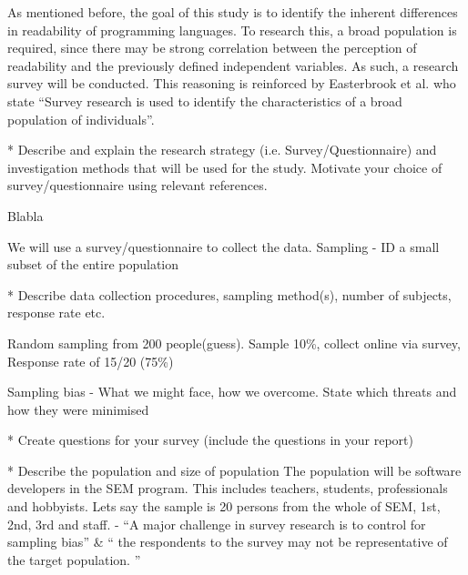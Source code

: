 \documentclass[times, 10pt,twocolumn]{IEEEtran}
\begin{document}
As mentioned before, the goal of this study is to identify the inherent differences in readability of programming languages. To research this, a broad population is required, since there may be strong correlation between the perception of readability and the previously defined independent variables. As such, a research survey will be conducted. This reasoning is reinforced by Easterbrook et al. \cite{easterbrook2008selecting} who state ``Survey research is used to identify the characteristics of a broad population of individuals''. 

* Describe  and explain the research  strategy (i.e.  Survey/Questionnaire)
and investigation methods that  will  be  used  for the study.  Motivate  your  
choice  of  survey/questionnaire  using relevant  references.
\newline


Blabla





We will use a survey/questionnaire to collect the data.
Sampling - ID a small subset of the entire population
\newline

* Describe  data  collection  procedures, sampling  method(s),  number  of  
subjects, response  rate  etc.
\newline

Random sampling from 200 people(guess). Sample 10\%, collect online via survey, Response rate of 15/20 (75\%)
\newline

Sampling bias - What we might face, how we overcome. State which threats and how they were minimised
\newline

* Create  questions for your  survey  (include  the questions in  your  report)
\newline

* Describe  the population  and size  of  population
\newline
The population will be software developers in the SEM program. This includes teachers, students, professionals and hobbyists. Lets say the sample is 20 persons from the whole of SEM, 1st, 2nd, 3rd and staff.
\newline
\cite{easterbrook2008selecting} - ``A major challenge in survey research is to control for sampling bias'' \& `` the respondents to 
the survey may not be representative of the target population. ''
\newline
\end{document}

